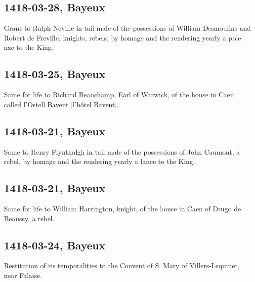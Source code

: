 \documentclass[a4paper,12pt,twoside]{book}
\begin{document}
                
                \subsection{1418-03-28, Bayeux}
                
                
                  Grant to Ralph Neville in tail male of the possessions of William Desmoulins and Robert de Freville, knights, rebels, by homage and the rendering yearly a pole axe to the King.
               
                
                \subsection{1418-03-25, Bayeux}
                
                
                  Same for life to Richard Beauchamp, Earl of Warwick, of the house in Caen called l'Ostell Bavent [l’hôtel Bavent].
               
                
                \subsection{1418-03-21, Bayeux}
                
                
                  Same to Henry Flynthalgh in tail male of the possessions of John Caumont, a rebel, by homage and the rendering yearly a lance to the King.
               
                
                \subsection{1418-03-21, Bayeux}
                
                
                  Same for life to William Harrington, knight, of the house in Caen of Drugo de Beaussy, a rebel.
               
                
                \subsection{1418-03-24, Bayeux}
                
                
                  Restitution of its temporalities to the Convent of S. Mary of Villers-Lequinet, near Falaise.
               
\end{document}
